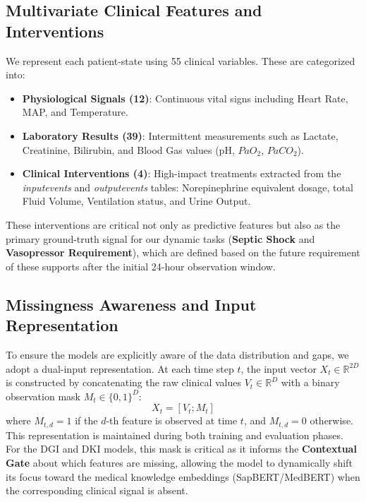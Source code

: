 \subsection{Multivariate Clinical Features and Interventions}
\label{subsec:features}
We represent each patient-state using 55 clinical variables. These are categorized into:
\begin{itemize}
    \item \textbf{Physiological Signals (12)}: Continuous vital signs including Heart Rate, MAP, and Temperature.
    \item \textbf{Laboratory Results (39)}: Intermittent measurements such as Lactate, Creatinine, Bilirubin, and Blood Gas values (pH, $PaO_2$, $PaCO_2$).
    \item \textbf{Clinical Interventions (4)}: High-impact treatments extracted from the \textit{inputevents} and \textit{outputevents} tables: Norepinephrine equivalent dosage, total Fluid Volume, Ventilation status, and Urine Output.
\end{itemize}
These interventions are critical not only as predictive features but also as the primary ground-truth signal for our dynamic tasks (\textbf{Septic Shock} and \textbf{Vasopressor Requirement}), which are defined based on the future requirement of these supports after the initial 24-hour observation window.


\subsection{Missingness Awareness and Input Representation}
\label{subsec:missingness}
To ensure the models are explicitly aware of the data distribution and gaps, we adopt a dual-input representation. At each time step $t$, the input vector $X_t \in \mathbb{R}^{2D}$ is constructed by concatenating the raw clinical values $V_t \in \mathbb{R}^D$ with a binary observation mask $M_t \in \{0, 1\}^D$:
\begin{equation}
    X_t = [V_t; M_t]
\end{equation}
where $M_{t,d} = 1$ if the $d$-th feature is observed at time $t$, and $M_{t,d} = 0$ otherwise. This representation is maintained during both training and evaluation phases. For the DGI and DKI models, this mask is critical as it informs the \textbf{Contextual Gate} about which features are missing, allowing the model to dynamically shift its focus toward the medical knowledge embeddings (SapBERT/MedBERT) when the corresponding clinical signal is absent.

